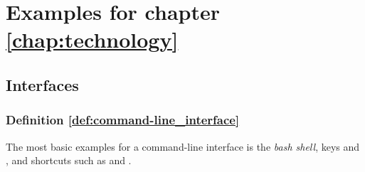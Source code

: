 \section{Examples for chapter \ref{chap:technology}} \label{chap:technology_examples}

\subsection{Interfaces}

\subsubsection{Definition \ref{def:command-line_interface}}
The most basic examples for a command-line interface is the \emph{bash shell}, keys  and , and shortcuts such as  and .



